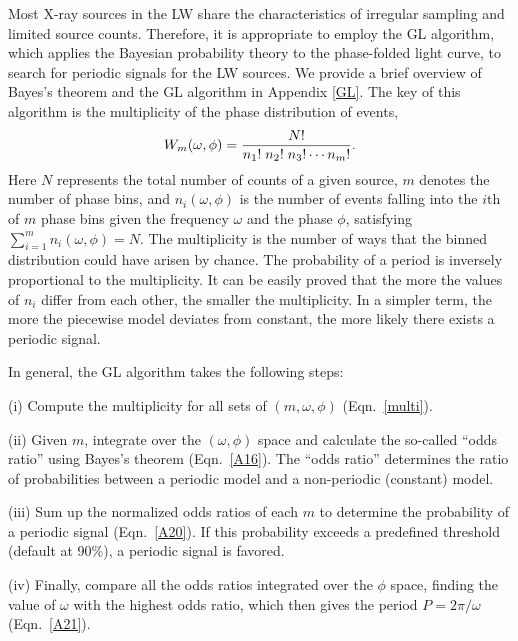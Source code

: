 \documentclass[fleqn,usenatbib]{mnras}
\begin{document}
Most X-ray sources in the LW share the characteristics of irregular sampling and limited source counts. 
Therefore, it is appropriate to employ the GL algorithm, which applies the Bayesian probability theory to the phase-folded light curve, to search for periodic signals for the LW sources. We provide a brief overview of Bayes's theorem and the GL algorithm in Appendix \ref{GL}. 
The key of this algorithm is the multiplicity of the phase distribution of events,
\begin{equation}\label{multi}
W_m(\omega, \phi)={{N!}\over{n_1!\; n_2!\; n_3!\cdots {n_m}!}}.
\end{equation}
Here $N$ represents the total number of counts of a given source, $m$ denotes the number of phase bins, and $n_i(\omega, \phi)$ is the number of events falling into the $i$th of $m$ phase bins given the frequency $\omega$ and the phase $\phi$, satisfying $\sum\limits_{i=1}^{m}n_i(\omega, \phi)=N$. 
The multiplicity is the number of ways that the binned distribution could have arisen by chance. The probability of a period is inversely proportional to the multiplicity. It can be easily proved that the more the values of $n_i$ differ from each other, the smaller the multiplicity. In a simpler term, the more the piecewise model deviates from constant, the more likely there exists a periodic signal. 

In general, the GL algorithm takes the following steps:

(i) Compute the multiplicity for all sets of $(m,\omega, \phi)$ (Eqn.~\ref{multi}).

(ii) Given $m$, integrate over the $(\omega, \phi)$ space and calculate the so-called ``odds ratio'' using Bayes's theorem (Eqn.~\ref{A16}). The ``odds ratio'' determines the ratio of probabilities between a periodic model and a non-periodic (constant) model.

(iii) Sum up the normalized odds ratios of each $m$ to determine the probability of a periodic signal (Eqn.~\ref{A20}).
If this probability exceeds a predefined threshold (default at 90\%), a periodic signal is favored. 

(iv) Finally, compare all the odds ratios integrated over the $\phi$ space, finding the value of $\omega$ with the highest odds ratio, which then gives the period $P=2{\pi}/\omega$ (Eqn.~\ref{A21}).

\end{document}
